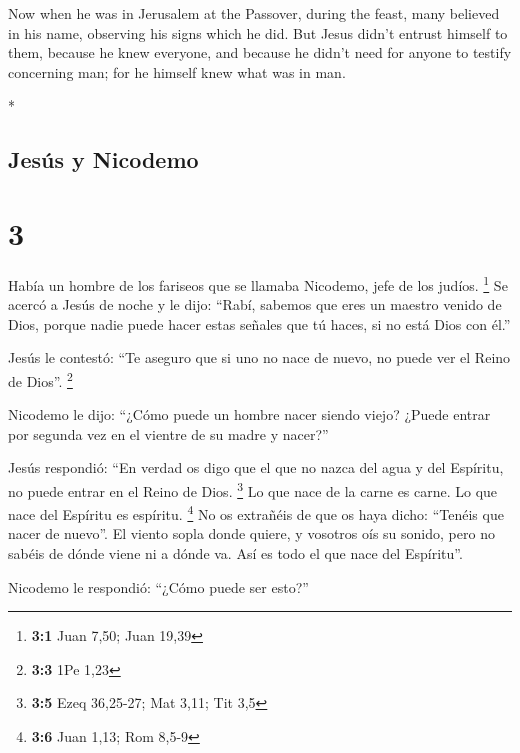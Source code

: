 \begin{paracol}{2}
\begin{otherlanguage}{english}
 Now when he was in Jerusalem at the Passover, during the
feast, many believed in his name, observing his signs which he did.
 But Jesus didn't entrust himself to them, because he
knew everyone,  and because he didn't need for anyone to
testify concerning man; for he himself knew what was in man.

\end{otherlanguage}

\switchcolumn[0]*

\hypertarget{jesuxfas-y-nicodemo}{%
\subsection{Jesús y Nicodemo}\label{jesuxfas-y-nicodemo}}

\hypertarget{section-4}{%
\section{3}\label{section-4}}

 Había un hombre de los fariseos que se llamaba Nicodemo,
jefe de los judíos. \footnote{\textbf{3:1} Juan 7,50; Juan 19,39}
 Se acercó a Jesús de noche y le dijo: ``Rabí, sabemos que
eres un maestro venido de Dios, porque nadie puede hacer estas señales
que tú haces, si no está Dios con él.''

 Jesús le contestó: ``Te aseguro que si uno no nace de
nuevo, no puede ver el Reino de Dios''. \footnote{\textbf{3:3} 1Pe 1,23}

 Nicodemo le dijo: ``¿Cómo puede un hombre nacer siendo
viejo? ¿Puede entrar por segunda vez en el vientre de su madre y
nacer?''

 Jesús respondió: ``En verdad os digo que el que no nazca
del agua y del Espíritu, no puede entrar en el Reino de Dios.
\footnote{\textbf{3:5} Ezeq 36,25-27; Mat 3,11; Tit 3,5} 
Lo que nace de la carne es carne. Lo que nace del Espíritu es espíritu.
\footnote{\textbf{3:6} Juan 1,13; Rom 8,5-9}  No os
extrañéis de que os haya dicho: ``Tenéis que nacer de nuevo''.
 El viento sopla donde quiere, y vosotros oís su sonido,
pero no sabéis de dónde viene ni a dónde va. Así es todo el que nace del
Espíritu''.

 Nicodemo le respondió: ``¿Cómo puede ser esto?''


\end{paracol}
